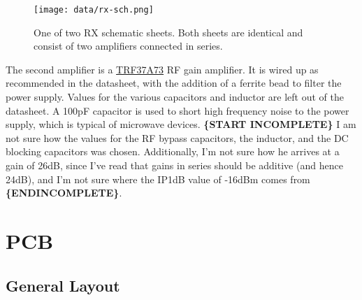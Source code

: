 \documentclass{default}
\begin{document}
\begin{figure}[h]
  \centering
  \texttt{[image: data/rx-sch.png]}
  \caption{One of two RX schematic sheets. Both sheets are identical and consist of two amplifiers
    connected in series.}
  \label{fig:rx-sch}
\end{figure}

The second amplifier is a \href{http://www.ti.com/lit/ds/symlink/trf37a73.pdf}{TRF37A73} RF gain
amplifier. It is wired up as recommended in the datasheet, with the addition of a ferrite bead to
filter the power supply. Values for the various capacitors and inductor are left out of the
datasheet. A 100pF capacitor is used to short high frequency noise to the power supply, which is
typical of microwave devices. \textbf{\{START INCOMPLETE\}} I am not sure how the values for the RF
bypass capacitors, the inductor, and the DC blocking capacitors was chosen. Additionally, I'm not
sure how he arrives at a gain of 26dB, since I've read that gains in series should be additive (and
hence 24dB), and I'm not sure where the IP1dB value of -16dBm comes from \textbf{\{ENDINCOMPLETE\}}.

\chapter{PCB}
\section{General Layout}
\end{document}
